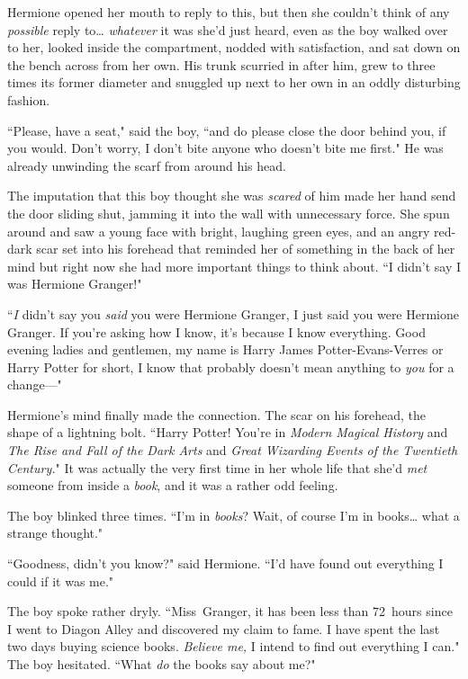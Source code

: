 Hermione opened her mouth to reply to this, but then she couldn't think of any \emph{possible} reply to{\ldots} \emph{whatever} it was she'd just heard, even as the boy walked over to her, looked inside the compartment, nodded with satisfaction, and sat down on the bench across from her own. His trunk scurried in after him, grew to three times its former diameter and snuggled up next to her own in an oddly disturbing fashion.

``Please, have a seat," said the boy, ``and do please close the door behind you, if you would. Don't worry, I don't bite anyone who doesn't bite me first." He was already unwinding the scarf from around his head.

The imputation that this boy thought she was \emph{scared} of him made her hand send the door sliding shut, jamming it into the wall with unnecessary force. She spun around and saw a young face with bright, laughing green eyes, and an angry red-dark scar set into his forehead that reminded her of something in the back of her mind but right now she had more important things to think about. ``I didn't say I was Hermione Granger!"

``\emph{I} didn't say you \emph{said} you were Hermione Granger, I just said you were Hermione Granger. If you're asking how I know, it's because I know everything. Good evening ladies and gentlemen, my name is Harry James Potter-Evans-Verres or Harry Potter for short, I know that probably doesn't mean anything to \emph{you} for a change---"

Hermione's mind finally made the connection. The scar on his forehead, the shape of a lightning bolt. ``Harry Potter! You're in \emph{Modern Magical History} and \emph{The Rise and Fall of the Dark Arts} and \emph{Great Wizarding Events of the Twentieth Century.}" It was actually the very first time in her whole life that she'd \emph{met} someone from inside a \emph{book}, and it was a rather odd feeling.

The boy blinked three times. ``I'm in \emph{books}? Wait, of course I'm in books{\ldots} what a strange thought."

``Goodness, didn't you know?" said Hermione. ``I'd have found out everything I could if it was me."

The boy spoke rather dryly. ``Miss~Granger, it has been less than 72~hours since I went to Diagon Alley and discovered my claim to fame. I have spent the last two days buying science books. \emph{Believe me,} I intend to find out everything I can." The boy hesitated. ``What \emph{do} the books say about me?"

